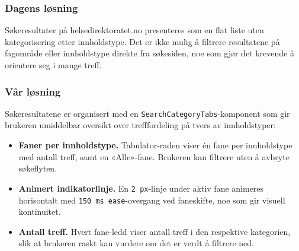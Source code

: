 \subsubsection{Dagens løsning}
\label{sec:sokegrensesnitt-idag}


Søkeresultater på helsedirektoratet.no presenteres som en flat liste
uten kategorisering etter innholdstype. Det er ikke mulig å filtrere
resultatene på fagområde eller innholdstype direkte fra søkesiden, noe
som gjør det krevende å orientere seg i mange treff.

\subsubsection{Vår løsning}
\label{sec:sokegrensesnitt-var}


Søkeresultatene er organisert med en \texttt{SearchCategoryTabs}-komponent
som gir brukeren umiddelbar oversikt over trefffordeling på tvers av
innholdstyper:

\begin{itemize}
    \item \textbf{Faner per innholdstype.} Tabulator-raden viser én fane
          per innholdstype med antall treff, samt en «Alle»-fane. Brukeren
          kan filtrere uten å avbryte søkeflyten.

    \item \textbf{Animert indikatorlinje.} En \texttt{2\,px}-linje under
          aktiv fane animeres horisontalt med \texttt{150\,ms
          ease}-overgang ved faneskifte, noe som gir visuell kontinuitet.

    \item \textbf{Antall treff.} Hvert fane-ledd viser antall treff i den
          respektive kategorien, slik at brukeren raskt kan vurdere om det
          er verdt å filtrere ned.
\end{itemize}


